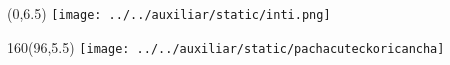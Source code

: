 \documentclass[shownotes,aspectratio=169]{beamer}
\begin{document}
\begin{frame}

\begin{textblock}{96}(0,6.5)\centering
{\texttt{[image: ../../auxiliar/static/inti.png]}}
\end{textblock}

\begin{textblock}{160}(96,5.5)
\texttt{[image: ../../auxiliar/static/pachacuteckoricancha]}
\end{textblock}

\end{frame}
\end{document}
